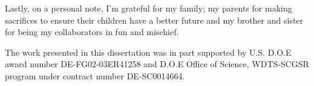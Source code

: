 Lastly, on a personal note, I'm grateful for my family; my parents for making sacrifices to ensure their children have a better future and my brother and sister for being my collaborators in fun and mischief.
 
The work presented in this dissertation was in part supported by U.S. D.O.E award number DE-FG02-03ER41258 and D.O.E Office of Science, WDTS-SCGSR program under contract number DE‐SC0014664.